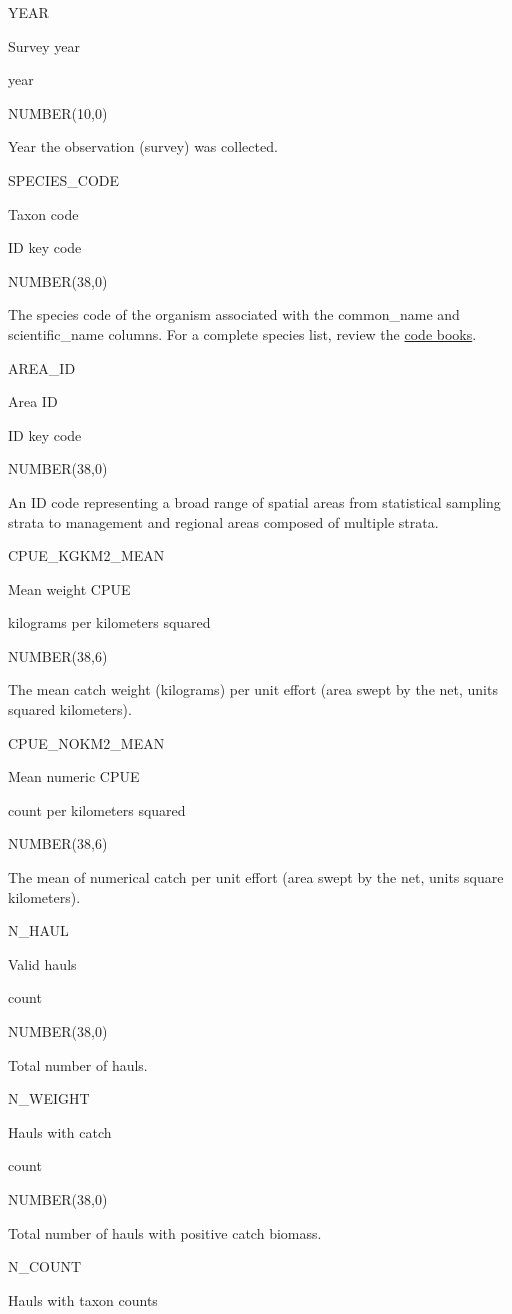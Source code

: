 \documentclass[
  letterpaper,
  oneside,
  open=any]{scrbook}
\begin{document}
YEAR

Survey year

year

NUMBER(10,0)

Year the observation (survey) was collected.

SPECIES\_CODE

Taxon code

ID key code

NUMBER(38,0)

The species code of the organism associated with the common\_name and
scientific\_name columns. For a complete species list, review the
\href{https://www.fisheries.noaa.gov/resource/document/groundfish-survey-species-code-manual-and-data-codes-manual}{code
books}.

AREA\_ID

Area ID

ID key code

NUMBER(38,0)

An ID code representing a broad range of spatial areas from statistical
sampling strata to management and regional areas composed of multiple
strata.

CPUE\_KGKM2\_MEAN

Mean weight CPUE

kilograms per kilometers squared

NUMBER(38,6)

The mean catch weight (kilograms) per unit effort (area swept by the
net, units squared kilometers).

CPUE\_NOKM2\_MEAN

Mean numeric CPUE

count per kilometers squared

NUMBER(38,6)

The mean of numerical catch per unit effort (area swept by the net,
units square kilometers).

N\_HAUL

Valid hauls

count

NUMBER(38,0)

Total number of hauls.

N\_WEIGHT

Hauls with catch

count

NUMBER(38,0)

Total number of hauls with positive catch biomass.

N\_COUNT

Hauls with taxon counts
\end{document}

